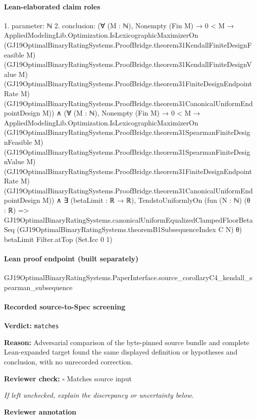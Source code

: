 \documentclass[10pt]{article}
\newcommand{\reviewerbox}{%
  \par\noindent\fbox{\parbox{0.96\linewidth}{\rule{0pt}{0.38in}}}\par
}
\newcommand{\reviewmatch}[1]{%
  \par\noindent\textbf{Reviewer check:} $\square$\; #1\par
  \noindent\emph{If left unchecked, explain the discrepancy or uncertainty below.}\par
}
\begin{document}
\paragraph{Lean-elaborated claim roles}\begin{ReviewVerbatim}
1. parameter: ℕ
2. conclusion: (∀ (M : ℕ),
    Nonempty (Fin M) →
      0 < M →
        AppliedModelingLib.Optimization.IsLexicographicMaximizerOn
          (GJ19OptimalBinaryRatingSystems.ProofBridge.theorem31KendallFiniteDesignFeasible M)
          (GJ19OptimalBinaryRatingSystems.ProofBridge.theorem31KendallFiniteDesignValue M)
          (GJ19OptimalBinaryRatingSystems.ProofBridge.theorem31FiniteDesignEndpointRate M)
          (GJ19OptimalBinaryRatingSystems.ProofBridge.theorem31CanonicalUniformEndpointDesign M)) ∧
  (∀ (M : ℕ),
      Nonempty (Fin M) →
        0 < M →
          AppliedModelingLib.Optimization.IsLexicographicMaximizerOn
            (GJ19OptimalBinaryRatingSystems.ProofBridge.theorem31SpearmanFiniteDesignFeasible M)
            (GJ19OptimalBinaryRatingSystems.ProofBridge.theorem31SpearmanFiniteDesignValue M)
            (GJ19OptimalBinaryRatingSystems.ProofBridge.theorem31FiniteDesignEndpointRate M)
            (GJ19OptimalBinaryRatingSystems.ProofBridge.theorem31CanonicalUniformEndpointDesign M)) ∧
    ∃ (betaLimit : ℝ → ℝ),
      TendstoUniformlyOn
        (fun (N : ℕ) (θ : ℝ) =>
          GJ19OptimalBinaryRatingSystems.canonicalUniformEqualizedClampedFloorBetaSeq
            (GJ19OptimalBinaryRatingSystems.theoremB1SubsequenceIndex C N) θ)
        betaLimit Filter.atTop (Set.Icc 0 1)
\end{ReviewVerbatim}

\paragraph{Lean proof endpoint (built separately)}\begin{ReviewVerbatim}
GJ19OptimalBinaryRatingSystems.PaperInterface.source_corollaryC4_kendall_spearman_subsequence
\end{ReviewVerbatim}

\paragraph{Recorded source-to-Spec screening}
\textbf{Verdict:} \texttt{matches}
\\
{\raggedright
\textbf{Reason:} Adversarial comparison of the byte-\allowbreak{}pinned source bundle and complete Lean-\allowbreak{}expanded target found the same displayed definition or hypotheses and conclusion, with no unrecorded correction.\allowbreak{}
\par}
\reviewmatch{Matches source input}
\noindent\textbf{Reviewer annotation}\par
\reviewerbox
\clearpage
\hypertarget{source-claim-3b01d7ad0b5d48f9}{}
\end{document}
